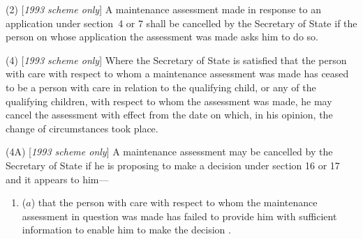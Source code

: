 \documentclass[12pt,a4paper]{article}
\begin{document}
(2) [\emph{1993 scheme only}] A maintenance assessment made in response to an application under section~4 or 7 shall be cancelled by 
the Secretary of State  %
if the person on whose application the assessment was made asks him to do so.

%

(4) [\emph{1993 scheme only}] Where 
the Secretary of State  %
is satisfied that the person with care with respect to whom a maintenance assessment was made has ceased to be a person with care in relation to the qualifying child, or any of the qualifying children, with respect to whom the assessment was made, he may cancel the assessment with effect from the date on which, in his opinion, the change of circumstances took place.

(4A) [\emph{1993 scheme only}] A maintenance assessment may be cancelled by 
the Secretary of State  %
if he is 
proposing to make a decision under section 16 or 17  %
and it appears to him—
\begin{enumerate}\item[]
($a$) that the person with care with respect to whom the maintenance assessment in question was made has failed to provide him with sufficient information to enable him to 
make the decision%
%
.
\end{enumerate}
\end{document}
